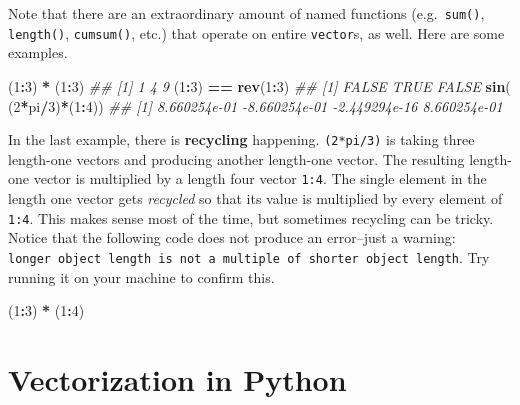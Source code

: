 \documentclass[12pt,krantz2]{krantz}
\makeatletter
\newenvironment{Shaded}{\begin{snugshade}}{\end{snugshade}}
\newcommand{\CommentTok}[1]{\textcolor[rgb]{0.37,0.37,0.37}{\textit{#1}}}
\newcommand{\DecValTok}[1]{\textcolor[rgb]{0.06,0.06,0.06}{#1}}
\newcommand{\KeywordTok}[1]{\textcolor[rgb]{0.27,0.27,0.27}{\textbf{#1}}}
\newcommand{\NormalTok}[1]{#1}
\newcommand{\OperatorTok}[1]{\textcolor[rgb]{0.43,0.43,0.43}{\textbf{#1}}}
\newcommand{\StringTok}[1]{\textcolor[rgb]{0.5,0.5,0.5}{#1}}
\newenvironment{kframe}{%
\medskip{}
\setlength{\fboxsep}{.8em}
 \def\at@end@of@kframe{}%
 \ifinner\ifhmode%
  \def\at@end@of@kframe{\end{minipage}}%
  \begin{minipage}{\columnwidth}%
 \fi\fi%
 \def\FrameCommand##1{\hskip\@totalleftmargin \hskip-\fboxsep
 \colorbox{shadecolor}{##1}\hskip-\fboxsep
     \hskip-\linewidth \hskip-\@totalleftmargin \hskip\columnwidth}%
 \MakeFramed {\advance\hsize-\width
   \@totalleftmargin\z@ \linewidth\hsize
   \@setminipage}}%
 {\par\unskip\endMakeFramed%
 \at@end@of@kframe}
\renewenvironment{Shaded}{\begin{kframe}}{\end{kframe}}
\makeatother
\begin{document}
Note that there are an extraordinary amount of named functions (e.g.~\texttt{sum()}, \texttt{length()}, \texttt{cumsum()}, etc.) that operate on entire \texttt{vector}s, as well. Here are some examples.

\begin{Shaded}
\begin{Highlighting}[]
\NormalTok{(}\DecValTok{1}\OperatorTok{:}\DecValTok{3}\NormalTok{) }\OperatorTok{*}\StringTok{ }\NormalTok{(}\DecValTok{1}\OperatorTok{:}\DecValTok{3}\NormalTok{)        }
\CommentTok{## [1] 1 4 9}
\NormalTok{(}\DecValTok{1}\OperatorTok{:}\DecValTok{3}\NormalTok{) }\OperatorTok{==}\StringTok{ }\KeywordTok{rev}\NormalTok{(}\DecValTok{1}\OperatorTok{:}\DecValTok{3}\NormalTok{)    }
\CommentTok{## [1] FALSE  TRUE FALSE}
\KeywordTok{sin}\NormalTok{( (}\DecValTok{2}\OperatorTok{*}\NormalTok{pi}\OperatorTok{/}\DecValTok{3}\NormalTok{)}\OperatorTok{*}\NormalTok{(}\DecValTok{1}\OperatorTok{:}\DecValTok{4}\NormalTok{)) }
\CommentTok{## [1]  8.660254e-01 -8.660254e-01 -2.449294e-16  8.660254e-01}
\end{Highlighting}
\end{Shaded}

In the last example, there is \textbf{recycling} happening. \texttt{(2*pi/3)} is taking three length-one vectors and producing another length-one vector. The resulting length-one vector is multiplied by a length four vector \texttt{1:4}. The single element in the length one vector gets \emph{recycled} so that its value is multiplied by every element of \texttt{1:4}.
This makes sense most of the time, but sometimes recycling can be tricky. Notice that the following code does not produce an error--just a warning: \texttt{longer\ object\ length\ is\ not\ a\ multiple\ of\ shorter\ object\ length}. Try running it on your machine to confirm this.

\begin{Shaded}
\begin{Highlighting}[]
\NormalTok{(}\DecValTok{1}\OperatorTok{:}\DecValTok{3}\NormalTok{) }\OperatorTok{*}\StringTok{ }\NormalTok{(}\DecValTok{1}\OperatorTok{:}\DecValTok{4}\NormalTok{)}
\end{Highlighting}
\end{Shaded}

\hypertarget{vectorization-in-python}{%
\section{Vectorization in Python}\label{vectorization-in-python}}
\end{document}
